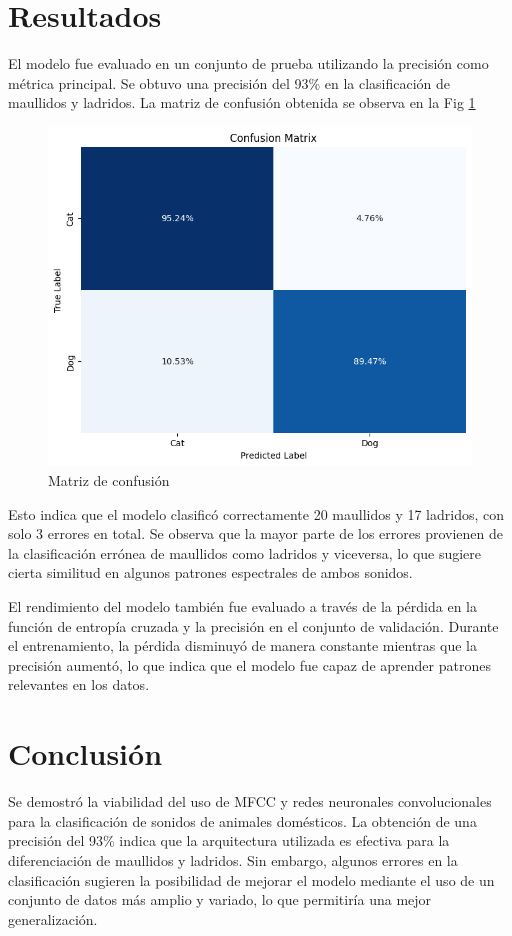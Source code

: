 \documentclass[journal]{IEEEtran}
\begin{document}
\section{Resultados}
El modelo fue evaluado en un conjunto de prueba utilizando la precisión como métrica principal. Se obtuvo una precisión del 93\% en la clasificación de maullidos y ladridos. La matriz de confusión obtenida se observa en la Fig \ref{fig:conf}

\begin{figure}
    \centering
    \includegraphics[width=0.5\linewidth]{Figs/conf.png}
    \caption{Matriz de confusión}
    \label{fig:conf}
\end{figure}

Esto indica que el modelo clasificó correctamente 20 maullidos y 17 ladridos, con solo 3 errores en total. Se observa que la mayor parte de los errores provienen de la clasificación errónea de maullidos como ladridos y viceversa, lo que sugiere cierta similitud en algunos patrones espectrales de ambos sonidos.

El rendimiento del modelo también fue evaluado a través de la pérdida en la función de entropía cruzada y la precisión en el conjunto de validación. Durante el entrenamiento, la pérdida disminuyó de manera constante mientras que la precisión aumentó, lo que indica que el modelo fue capaz de aprender patrones relevantes en los datos.

\section{Conclusión}
Se demostró la viabilidad del uso de MFCC y redes neuronales convolucionales para la clasificación de sonidos de animales domésticos. La obtención de una precisión del 93\% indica que la arquitectura utilizada es efectiva para la diferenciación de maullidos y ladridos. Sin embargo, algunos errores en la clasificación sugieren la posibilidad de mejorar el modelo mediante el uso de un conjunto de datos más amplio y variado, lo que permitiría una mejor generalización.
\end{document}
